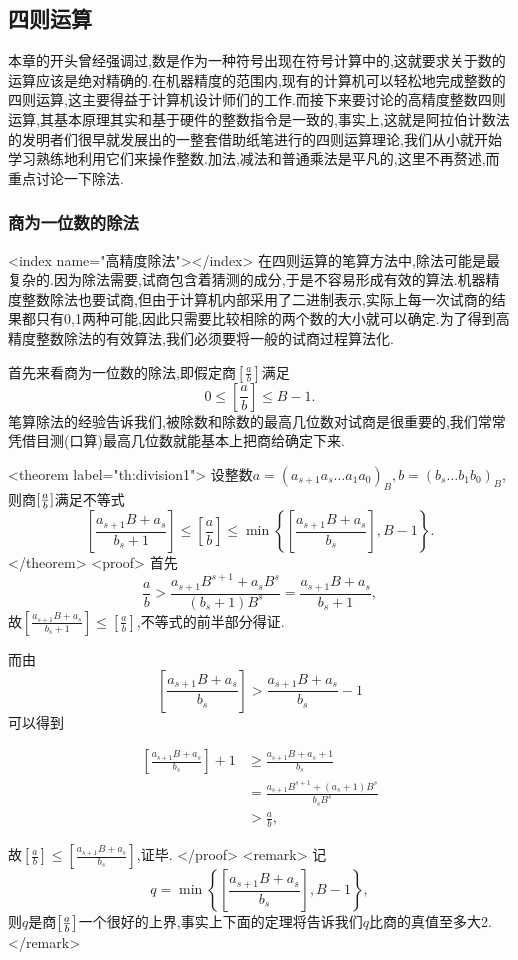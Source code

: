 \documentclass{ctexart}
\begin{document}
\subsection{四则运算}

本章的开头曾经强调过,数是作为一种符号出现在符号计算中的,这就要求关于数的运算应该是绝对精确的.在机器精度的范围内,现有的计算机可以轻松地完成整数的四则运算,这主要得益于计算机设计师们的工作.而接下来要讨论的高精度整数四则运算,其基本原理其实和基于硬件的整数指令是一致的,事实上,这就是阿拉伯计数法的发明者们很早就发展出的一整套借助纸笔进行的四则运算理论,我们从小就开始学习熟练地利用它们来操作整数.加法,减法和普通乘法是平凡的,这里不再赘述,而重点讨论一下除法.

\subsubsection{商为一位数的除法}
<index name="高精度除法"></index>
在四则运算的笔算方法中,除法可能是最复杂的.因为除法需要,试商包含着猜测的成分,于是不容易形成有效的算法.机器精度整数除法也要试商,但由于计算机内部采用了二进制表示,实际上每一次试商的结果都只有0,1两种可能,因此只需要比较相除的两个数的大小就可以确定.为了得到高精度整数除法的有效算法,我们必须要将一般的试商过程算法化.

首先来看商为一位数的除法,即假定商$\left[\frac{a}{b}\right]$满足$$0\le\left[\frac{a}{b}\right]\le B-1.$$笔算除法的经验告诉我们,被除数和除数的最高几位数对试商是很重要的,我们常常凭借目测(口算)最高几位数就能基本上把商给确定下来.

<theorem label="th:division1">
设整数$a=(a_{s+1}a_s\ldots a_1a_0)_B,b=(b_s\ldots b_1b_0)_B$,则商$[{a\over b}]$满足不等式
$$\left[\frac{a_{s+1}B+a_s}{b_s+1}\right]\le\left[\frac{a}{b}\right]\le\min\left\{\left[\frac{a_{s+1}B+a_s}{b_s}\right],B-1\right\}.$$
</theorem>
<proof>
首先$$\frac{a}{b}>\frac{a_{s+1}B^{s+1}+a_sB^s}{(b_s+1)B^s}=\frac{a_{s+1}B+a_s}{b_s+1},$$故$\left[\frac{a_{s+1}B+a_s}{b_s+1}\right] \le \left[\frac{a}{b}\right]$,不等式的前半部分得证.

而由$$\left[\frac{a_{s+1}B+a_s}{b_s}\right] > \frac{a_{s+1}B+a_s}{b_s}-1$$可以得到

\begin{align*}
  \left[\frac{a_{s+1}B+a_s}{b_s}\right]+1&\ge\frac{a_{s+1}B+a_s+1}{b_s}\\
&=\frac{a_{s+1}B^{s+1}+(a_s+1)B^s}{b_sB^s}\\
&>\frac{a}{b},
\end{align*}

故$\left[\frac{a}{b}\right]\le\left[\frac{a_{s+1}B+a_s}{b_s}\right]$,证毕.
</proof>
<remark>
记$$q = \min\left\{\left[\frac{a_{s+1}B+a_s}{b_s}\right],B-1\right\},$$则$q$是商$\left[{a\over b}\right]$一个很好的上界,事实上下面的定理将告诉我们$q$比商的真值至多大2.
</remark>
\end{document}
